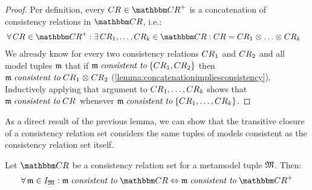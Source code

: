 \begin{proof}
    Per definition, every $\consistencyrelation{CR}{} \in \transitiveclosure{\consistencyrelationset{CR}}$ is a concatenation of consistency relations in $\consistencyrelationset{CR}$, i.e.:
    \begin{align*}
        &
        \forall \consistencyrelation{CR}{} \in \transitiveclosure{\consistencyrelationset{CR}} : \exists \consistencyrelation{CR}{1}, \dots, \consistencyrelation{CR}{k} \in \consistencyrelationset{CR} :
        \consistencyrelation{CR}{} = \consistencyrelation{CR}{1} \concat \dots \concat \consistencyrelation{CR}{k}
    \end{align*}
    We already know for every two consistency relations $\consistencyrelation{CR}{1}$ and $\consistencyrelation{CR}{2}$ and all model tuples $\modeltuple{m}$ that if $\modeltuple{m} \consistenttomath \setted{\consistencyrelation{CR}{1}, \consistencyrelation{CR}{2}}$ then $\modeltuple{m} \consistenttomath \consistencyrelation{CR}{1} \concat \consistencyrelation{CR}{2}$ (\autoref{lemma:concatenationimpliesconsistency}).
    Inductively applying that argument to $\consistencyrelation{CR}{1}, \dots, \consistencyrelation{CR}{k}$ shows that $\modeltuple{m} \consistenttomath \consistencyrelation{CR}{}$ whenever $\modeltuple{m} \consistenttomath \setted{\consistencyrelation{CR}{1}, \dots, \consistencyrelation{CR}{k}}$.
\end{proof}

As a direct result of the previous lemma, we can show that the transitive closure of a consistency relation set considers the same tuples of models consistent as the consistency relation set itself.

\begin{lemma} \label{lemma:consistencytransitiveclosure}
    Let $\consistencyrelationset{CR}$ be a consistency relation set for a metamodel tuple $\metamodeltuple{M}$.
    Then:
    \begin{align*}
        \forall \modeltuple{m} \in \metamodeltupleinstanceset{M}: \modeltuple{m} \consistenttomath \consistencyrelationset{CR} \equivalent
        \modeltuple{m} \consistenttomath \transitiveclosure{\consistencyrelationset{CR}}
    \end{align*}
\end{lemma}


